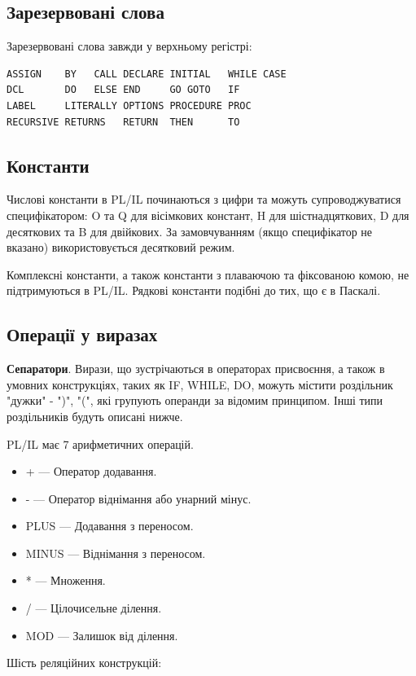 \documentclass{memoir}
\begin{document}
\subsection{Зарезервовані слова}
Зарезервовані слова завжди у верхньому регістрі:

\begin{lstlisting}
ASSIGN    BY   CALL DECLARE INITIAL   WHILE CASE
DCL       DO   ELSE END     GO GOTO   IF
LABEL     LITERALLY OPTIONS PROCEDURE PROC
RECURSIVE RETURNS   RETURN  THEN      TO
\end{lstlisting}

\subsection{Константи}
Числові константи в PL/IL починаються з цифри та можуть супроводжуватися
специфікатором: O та Q для вісімкових констант, H для шістнадцяткових, D
для десяткових та B для двійкових. За замовчуванням (якщо специфікатор
не вказано) використовується десятковий режим.

Комплексні константи, а також константи з плаваючою та фіксованою комою,
не підтримуються в PL/IL. Рядкові константи подібні до тих, що є в Паскалі.

\subsection{Операції у виразах}
\textbf{Сепаратори}. Вирази, що зустрічаються в операторах присвоєння,
а також в умовних конструкціях, таких як IF, WHILE, DO, можуть містити
роздільник "дужки" - ")", "(", які групують операнди за відомим принципом.
Інші типи роздільників будуть описані нижче.

PL/IL має 7 арифметичних операцій.

\begin{itemize}
\item + --- Оператор додавання.
\item - --- Оператор віднімання або унарний мінус.
\item PLUS --- Додавання з переносом.
\item MINUS --- Віднімання з переносом.
\item * --- Множення.
\item / --- Цілочисельне ділення.
\item MOD --- Залишок від ділення.
\end{itemize}

Шість реляційних конструкцій:
\end{document}
